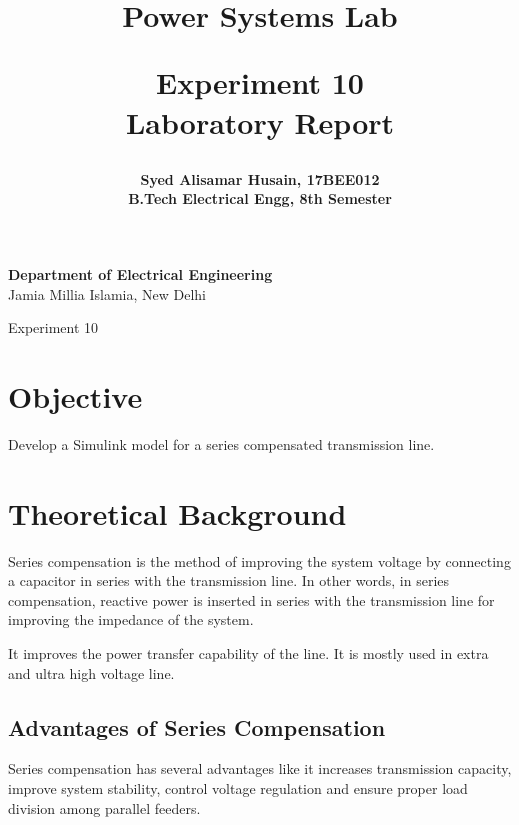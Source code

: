 \documentclass[12pt]{article}
\title{
  {\Huge \bf Power Systems Lab}\\
  \vspace{0.25in}

  {\bf Experiment 10}\\
  Laboratory Report
  \vspace{1in}
}
\author{
  \bf Syed Alisamar Husain, 17BEE012\\
  B.Tech Electrical Engg, 8th Semester
}
\begin{document}
  \begin{titlepage}
    \maketitle
    \vspace*{\fill}
    \begin{center}
      {\bfseries Department of Electrical Engineering} \\
      Jamia Millia Islamia, New Delhi
    \end{center}
    \thispagestyle{empty}
  \end{titlepage}
  
  \newpage
  \begin{center}
    \huge Experiment 10
    \vspace{0.5in}
  \end{center}

  \section{Objective}
  Develop a Simulink model for a series compensated 
  transmission line.

  \section{Theoretical Background}
  Series compensation is the method of improving the system 
  voltage by connecting a capacitor in series with the transmission line. 
  In other words, in series compensation, reactive power is inserted in 
  series with the transmission line for improving the impedance of the system. 
  
  It improves the power transfer capability of the line. It is mostly 
  used in extra and ultra high voltage line.

    \subsection{Advantages of Series Compensation}
    Series compensation has several advantages like it increases transmission 
    capacity, improve system stability, control voltage regulation and ensure 
    proper load division among parallel feeders.
\end{document}
